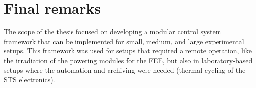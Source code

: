 




\section{Final remarks}

The scope of the thesis focused on developing a modular control system framework that can be implemented for small, medium, and large experimental setups. This framework was used for setups that required a remote operation, like the irradiation of the powering modules for the \gls{FEE}, but also in laboratory-based setups where the automation and archiving were needed (thermal cycling of the \gls{STS} electronics).

